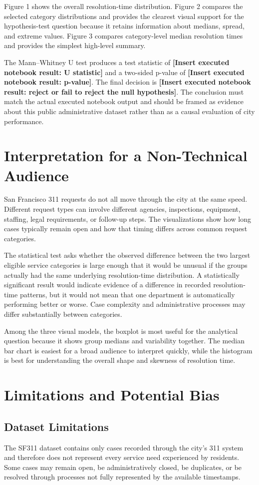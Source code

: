 \documentclass[12pt]{article}
\newcommand{\resultplaceholder}[1]{\textbf{[Insert executed notebook result: #1]}}
\begin{document}
Figure 1 shows the overall resolution-time distribution. Figure 2 compares the selected category distributions and provides the clearest visual support for the hypothesis-test question because it retains information about medians, spread, and extreme values. Figure 3 compares category-level median resolution times and provides the simplest high-level summary.

The Mann--Whitney U test produces a test statistic of \resultplaceholder{U statistic} and a two-sided p-value of \resultplaceholder{p-value}. The final decision is \resultplaceholder{reject or fail to reject the null hypothesis}. The conclusion must match the actual executed notebook output and should be framed as evidence about this public administrative dataset rather than as a causal evaluation of city performance.

\section*{Interpretation for a Non-Technical Audience}
San Francisco 311 requests do not all move through the city at the same speed. Different request types can involve different agencies, inspections, equipment, staffing, legal requirements, or follow-up steps. The visualizations show how long cases typically remain open and how that timing differs across common request categories.

The statistical test asks whether the observed difference between the two largest eligible service categories is large enough that it would be unusual if the groups actually had the same underlying resolution-time distribution. A statistically significant result would indicate evidence of a difference in recorded resolution-time patterns, but it would not mean that one department is automatically performing better or worse. Case complexity and administrative processes may differ substantially between categories.

Among the three visual models, the boxplot is most useful for the analytical question because it shows group medians and variability together. The median bar chart is easiest for a broad audience to interpret quickly, while the histogram is best for understanding the overall shape and skewness of resolution time.

\section*{Limitations and Potential Bias}
\subsection*{Dataset Limitations}
The SF311 dataset contains only cases recorded through the city's 311 system and therefore does not represent every service need experienced by residents. Some cases may remain open, be administratively closed, be duplicates, or be resolved through processes not fully represented by the available timestamps.
\end{document}
